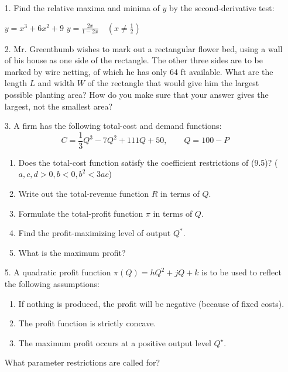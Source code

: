 \documentclass{./../../Latex/homework}
\begin{document}
\begin{enumerate}

\item[1.] Find the relative maxima and minima of $y$ by the second-derivative test:
\begin{tasks}
\task[(b)] $y=x^{3}+6 x^{2}+9$
\task[(d)] $y=\frac{2 x}{1-2 x} \quad\left(x \neq \frac{1}{2}\right)$
\end{tasks}

\item[2.] Mr. Greenthumb wishes to mark out a rectangular flower bed, using a wall of his house as one side of the rectangle. The other three sides are to be marked by wire netting, of which he has only 64 ft available. What are the length $L$ and width $W$ of the rectangle that would give him the largest possible planting area? How do you make sure that your answer gives the largest, not the smallest area?

\item[3.] A firm has the following total-cost and demand functions:
$$C=\frac{1}{3} Q^{3}-7 Q^{2}+111 Q+50, \quad \quad Q=100-P$$
\begin{enumerate}
\item Does the total-cost function satisfy the coefficient restrictions of (9.5)? ($a, c, d>0, b<0, b^{2}<3 a c$)
\item Write out the total-revenue function $R$ in terms of $Q$.
\item Formulate the total-profit function $\pi$ in terms of $Q$.
\item Find the profit-maximizing level of output $Q^{*}$.
\item What is the maximum profit?
\end{enumerate}

\item[5.] A quadratic profit function $\pi(Q)=h Q^{2}+j Q+k$ is to be used to reflect the following assumptions:
\begin{enumerate}
\item If nothing is produced, the profit will be negative (because of fixed costs).
\item The profit function is strictly concave.
\item The maximum profit occurs at a positive output level $Q^{\star}$.
\end{enumerate}
What parameter restrictions are called for?

\end{enumerate}
\end{document}
